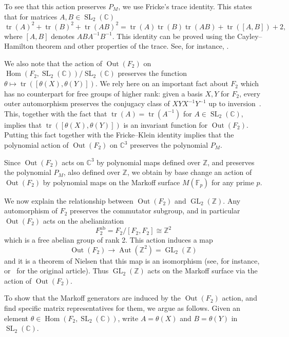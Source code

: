 \documentclass[10pt]{amsart}
\theoremstyle{definition}\newtheorem{defi}[theo]{Definition}\newtheorem{rema}[theo]{Remark}\newtheorem{exam}[theo]{Example}\newtheorem{exem}[theo]{Example}\newtheorem{nota}[theo]{Notation}
\newcommand{\Z}{\mathbb{Z}}
\newcommand{\CC}{\mathbb{C}}
\newcommand{\F}{\mathbb{F}}
\DeclareMathOperator{\tr}{tr}
\DeclareMathOperator{\GL}{GL}
\DeclareMathOperator{\SL}{SL}
\DeclareMathOperator{\Hom}{Hom}
\DeclareMathOperator{\Aut}{Aut}
\DeclareMathOperator{\Out}{Out}
\begin{document}
To see that this action preserves $P_M$, we use Fricke's trace identity. This states that for matrices $A,B \in \SL_2(\CC)$
\[
\tr(A)^2 + \tr(B)^2 + \tr(AB)^2 = \tr(A)\tr(B)\tr(AB) + \tr([A,B]) + 2,
\]
where $[A,B]$ denotes $ABA^{-1}B^{-1}$. This identity can be proved using the Cayley--Hamilton theorem and other properties of the trace. See, for instance, \cite[Proposition~4.3]{A}.


We also note that the action of $\Out(F_2)$ on $\Hom(F_{2},\SL_{2}(\CC))/\SL_{2}(\CC)$ preserves the function $\theta\mapsto\tr([\theta(X), \theta(Y)])$. We rely here on an important fact about $F_2$ which has no counterpart for free groups of higher rank: given a basis $X,Y$ for $F_2$, every outer automorphism preserves the conjugacy class of $XYX^{-1}Y^{-1}$ up to inversion~\cite{N}. This, together with the fact that $\tr(A) = \tr(A^{-1})$ for $A \in \SL_2(\CC)$, implies that $\tr([\theta(X), \theta(Y)])$ is an invariant function for $\Out(F_2)$. Putting this fact together with the Fricke--Klein identity implies that the polynomial action of $\Out(F_2)$ on $\CC^3$ preserves the polynomial $P_M$.

Since $\Out(F_2)$ acts on $\CC^3$ by polynomial maps defined over $\Z$, and preserves the polynomial $P_M$, also defined over $\Z$, we obtain by base change an action of $\Out(F_2)$ by polynomial maps on the Markoff surface $M(\F_p)$ for any prime $p$.
\goodbreak

We now explain the relationship between $\Out(F_2)$ and $\GL_2(\Z)$. Any automorphism of $F_2$ preserves the commutator subgroup, and in particular $\Out(F_2)$ acts on the abelianization
\[
F_2^{\text{ab}} = F_2/[F_2,F_2] \cong \Z^2
\]
which is a free abelian group of rank 2. This action induces a map
\[
\Out(F_2) \rightarrow \Aut(\Z^2) = \GL_2(\Z)
\]
and it is a theorem of Nielsen that this map is an isomorphism (see, for instance, \cite[Theorem~6.24]{A} or~\cite{N} for the original article). Thus $\GL_2(\Z)$ acts on the Markoff surface via the action of $\Out(F_2)$.

To show that the Markoff generators are induced by the $\Out(F_2)$ action, and find specific matrix representatives for them, we argue as follows. Given an element $\theta \in \Hom(F_2, \SL_2(\CC))$, write $A=\theta(X)$ and $B = \theta(Y)$ in $\SL_2(\CC)$.
\end{document}
